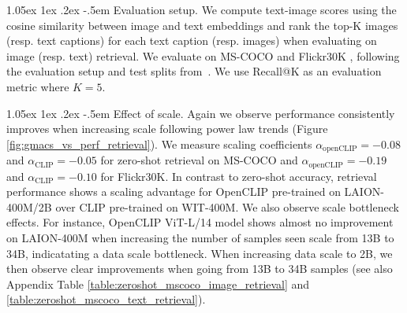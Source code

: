 \documentclass[11pt,table]{article}
\makeatletter
\newcommand{\citep}{\cite}
\renewcommand\paragraph{\@startsection{paragraph}{4}{\z@}                                     {1.05ex \@plus1ex \@minus.2ex}                                {-.5em}
{\normalfont\normalsize\bfseries}}
\makeatother
\begin{document}
\paragraph{Evaluation setup.}
We compute text-image scores using the cosine similarity between image and text embeddings and rank the top-K images (resp. text captions) for each text caption (resp. images) when evaluating on image (resp. text) retrieval.
We evaluate on MS-COCO \citep{lin2014microsoft} and Flickr30K \citep{flickr30_young2014image}, following the evaluation setup and test splits from~\cite{karpathy2015deep}. We use Recall@K as an evaluation metric where $K=5$.%

\paragraph{Effect of scale.} Again we observe performance consistently improves when increasing scale following power law trends (Figure \ref{fig:gmacs_vs_perf_retrieval}). We measure scaling coefficients $\alpha_{\text{openCLIP}}=-0.08$ and $\alpha_{\text{CLIP}}=-0.05$ for zero-shot retrieval on MS-COCO and $\alpha_{\text{openCLIP}}=-0.19$ and $\alpha_{\text{CLIP}}=-0.10$ for Flickr30K. In contrast to zero-shot accuracy, retrieval performance shows a scaling advantage for OpenCLIP pre-trained on LAION-400M/2B over CLIP pre-trained on WIT-400M. We also observe scale bottleneck effects. For instance, OpenCLIP ViT-L/14 model shows almost no improvement on LAION-400M when increasing the number of samples seen scale from 13B to 34B, indicatating a data scale bottleneck. When increasing data scale to 2B, we then observe clear improvements when going from 13B to 34B samples (see also Appendix Table \ref{table:zeroshot_mscoco_image_retrieval} and \ref{table:zeroshot_mscoco_text_retrieval}).
\end{document}
